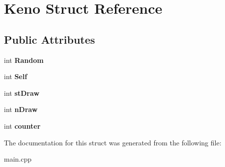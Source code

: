 \hypertarget{struct_keno}{\section{Keno Struct Reference}
\label{struct_keno}
}
\subsection*{Public Attributes}
\begin{DoxyCompactItemize}
\item 
\hypertarget{struct_keno_a72026b482f694ca0523bf6823bfa5398}{int {\bfseries Random}}\label{struct_keno_a72026b482f694ca0523bf6823bfa5398}

\item 
\hypertarget{struct_keno_a4527cabf825f14d2492376f2d9b5d575}{int {\bfseries Self}}\label{struct_keno_a4527cabf825f14d2492376f2d9b5d575}

\item 
\hypertarget{struct_keno_a4d41b7c435352827b1a62d92d3f97d8b}{int {\bfseries st\-Draw}}\label{struct_keno_a4d41b7c435352827b1a62d92d3f97d8b}

\item 
\hypertarget{struct_keno_a6f68b76cd2ace9ed037749080ff56051}{int {\bfseries n\-Draw}}\label{struct_keno_a6f68b76cd2ace9ed037749080ff56051}

\item 
\hypertarget{struct_keno_a8a667845562f6ab7c92d56d59ce9cf10}{int {\bfseries counter}}\label{struct_keno_a8a667845562f6ab7c92d56d59ce9cf10}

\end{DoxyCompactItemize}


The documentation for this struct was generated from the following file\-:\begin{DoxyCompactItemize}
\item 
main.\-cpp\end{DoxyCompactItemize}
